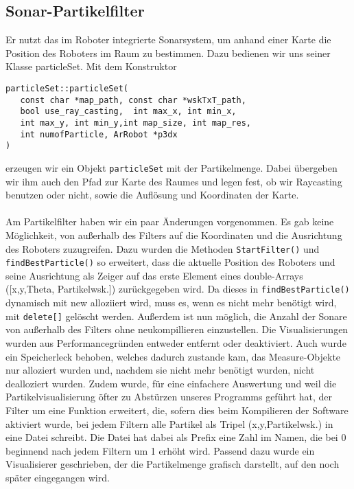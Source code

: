 \subsection{Sonar-Partikelfilter}
\label{sec:sonarparticlefilter}
Er nutzt das im Roboter integrierte
Sonarsystem, um anhand einer Karte die Position des Roboters im Raum
zu bestimmen. Dazu bedienen wir uns seiner Klasse particleSet. 
Mit dem Konstruktor 
\begin{lstlisting}
particleSet::particleSet(
   const char *map_path, const char *wskTxT_path, 
   bool use_ray_casting,  int max_x, int min_x, 
   int max_y, int min_y,int map_size, int map_res, 
   int numofParticle, ArRobot *p3dx
)
\end{lstlisting}
erzeugen wir ein Objekt
\lstinline|particleSet| mit der Partikelmenge. Dabei übergeben wir ihm auch den Pfad zur
Karte des Raumes und legen fest, ob wir Raycasting benutzen oder
nicht, sowie die Auflösung und Koordinaten der Karte.  \\\\
Am Partikelfilter haben wir ein paar Änderungen vorgenommen. Es gab keine
Möglichkeit, von außerhalb des Filters auf die Koordinaten und die
Ausrichtung des Roboters zuzugreifen. Dazu wurden die Methoden
\lstinline|StartFilter()|
und \lstinline|findBestParticle()| so erweitert, dass die aktuelle Position des Roboters
und seine Ausrichtung als Zeiger auf das erste Element eines double-Arrays
([x,y,Theta, Partikelwsk.]) zurückgegeben wird. Da dieses in
\lstinline|findBestParticle()| dynamisch mit new alloziiert wird, muss es, wenn es nicht
mehr benötigt wird, mit \lstinline|delete[]| gelöscht werden. Außerdem ist nun
möglich, 
die Anzahl der Sonare von außerhalb des Filters ohne neukompillieren
einzustellen. Die Visualisierungen wurden aus Performancegründen entweder
entfernt oder deaktiviert. Auch wurde ein Speicherleck behoben, welches dadurch zustande kam,
das Measure-Objekte nur alloziert wurden und, nachdem sie nicht mehr benötigt wurden,
nicht dealloziert wurden. Zudem wurde, für eine einfachere Auswertung und
weil die Partikelvisualisierung öfter zu Abstürzen unseres Programms
geführt hat, der Filter um eine Funktion erweitert, die, sofern dies
beim Kompilieren der Software aktiviert wurde,  bei jedem Filtern alle Partikel als
Tripel (x,y,Partikelwsk.) in eine Datei schreibt. Die Datei hat
dabei als Prefix eine Zahl im Namen, die bei 0 beginnend nach jedem Filtern
 um 1 erhöht wird. Passend dazu wurde ein Visualisierer geschrieben, der
die Partikelmenge grafisch darstellt, auf den noch später eingegangen
wird.

